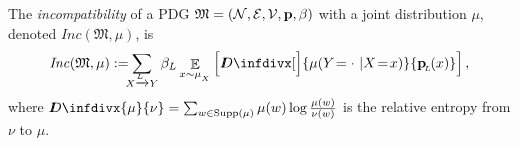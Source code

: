 \documentclass{article}
\theoremstyle{plain}
\theoremstyle{definition}
\theoremstyle{remark}
\newcommand{\thickD}{I\mkern-8muD}
\newcommand{\kldiv}{\thickD\infdivx}%
\newcommand\mat[1]{\mathbf{#1}}
\def\sheq{\!=\!}
\newcommand{\bmu}{\boldsymbol{\mu}}
\newcommand{\bp}[1][L]{\mat{p}_{\!_{#1}\!}}
\newcommand{\V}{\mathcal V}
\newcommand{\dg}[1]{\mathfrak{#1}}
\newcommand\Inc{\mathit{Inc}}
\newcommand{\ed}[3]{#2 \xrightarrow{\!\!\smash{#1}} #3}
\newcommand{\alle}[1][L]{_{ \ed {#1\vphantom{g}}XY}}
\numberwithin{equation}{section}
\begin{document}
	\begin{defn}\label{def:zeta-score}
	       	The \emph{incompatibility} of a PDG $\dg M = \mnvars[]$ with
		a joint distribution $\mu$,	
                                denoted $\Inc(\dg M,\mu)$, is  
	                        \[
			\Inc(\dg M , \mu) := %
			\!\!\!\sum
				\alle
				\beta_L
                        \mathop{\mathbb E}_{x \sim \mu_{_X}}
                        \left[\kldiv[\Big]{ \mu(Y\!= \cdot\ | X \sheq
                                                        x) }{\bp(x) } \right] ,
		\]
		where $\kldiv{\mu}{\nu} = \sum_{w \in \text{Supp($\mu$)}} \mu(w) \log\frac{\mu(w)}{\nu(w)}$ is the 
		relative
		entropy from $\nu$ to $\mu$.

\end{defn}
\end{document}
